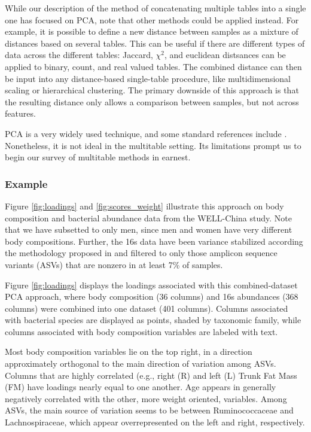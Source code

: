 \documentclass{article}
\begin{document}
While our description of the method of concatenating multiple tables into a
single one has focused on PCA, note that other methods could be applied instead.
For example, it is possible to define a new distance between samples as a
mixture of distances based on several tables. This can be useful if there are
different types of data across the different tables: Jaccard, $\chi^{2}$, and
euclidean distsances can be applied to binary, count, and real valued tables.
The combined distance can then be input into any distance-based single-table
procedure, like multidimensional scaling or hierarchical clustering. The primary
downside of this approach is that the resulting distance only allows a
comparison between samples, but not across features.

PCA is a very widely used technique, and some standard references include
\citep{friedman2001elements, mardia1980multivariate, pages2014multiple}.
Nonetheless, it is not ideal in the multitable setting. Its limitations prompt
us to begin our survey of multitable methods in earnest.

\subsubsection{Example}
\label{subsubsec:pca_example}

Figure \ref{fig:loadings} and \ref{fig:scores_weight} illustrate this approach
on body composition and bacterial abundance data from the WELL-China study.
Note that we have subsetted to only men, since men and women have very different
body compositions. Further, the 16s data have been variance stabilized according
the methodology proposed in \citep{Anders2010} and filtered to only those
amplicon sequence variants (ASVs) that are nonzero in at least 7\% of samples.

Figure \ref{fig:loadings} displays the loadings associated with this
combined-dataset PCA approach, where body composition (36 columns) and 16s
abundances (368 columns) were combined into one dataset (401 columns). Columns
associated with bacterial species are displayed as points, shaded by taxonomic
family, while columns associated with body composition variables are labeled
with text.

Most body composition variables lie on the top right, in a direction
approximately orthogonal to the main direction of variation among ASVs. Columns
that are highly correlated (e.g., right (R) and left (L) Trunk Fat Mass (FM)
have loadings nearly equal to one another. Age appears in generally negatively
correlated with the other, more weight oriented, variables. Among ASVs, the main
source of variation seems to be between Ruminococcaceae and Lachnospiraceae,
which appear overrepresented on the left and right, respectively.
\end{document}
